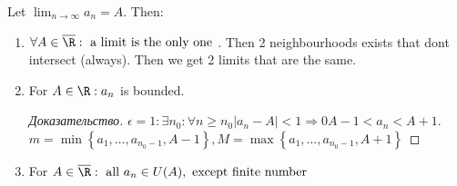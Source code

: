 \begin{property}
	Let $\lim_{n \to \infty} a_n = A$. Then: 
	\begin{enumerate}
		\item $\forall A \in \overline{\R}: \text{ a limit is the only one } $. Then 2 neighbourhoods exists that dont intersect (always). Then we get 2 limits that are the same.
		\item For $A \in \R: a_n $ is bounded. 
			\begin{proof}[Доказательство]
				$\epsilon = 1: \exists n_0: \forall n \geq n_0 \left| a_n - A \right| < 1 \Rightarrow 0 A-1 < a_n < A+1$. $m = \min \left\{ a_1, \dots , a_{n_0-1}, A - 1 \right \}, M = \max \left\{ a_1, \dots , a_{n_0-1}, A+1 \right \} $
			\end{proof}
		\item For $A \in \overline{\R}: \text{ all } a_n \in U(A), \text{ except finite number } $ 
	\end{enumerate}
\end{property}
